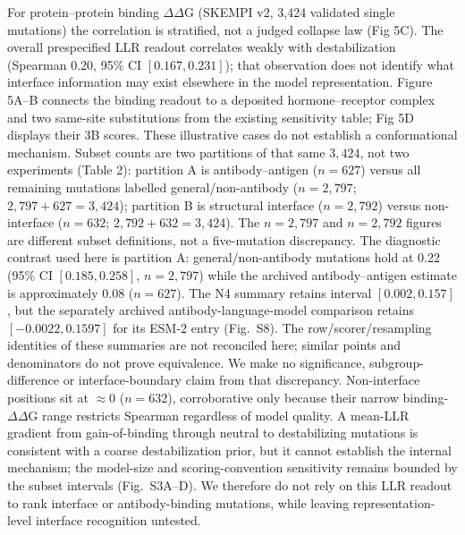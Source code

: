 \documentclass[12pt]{article}
\begin{document}
For protein--protein binding $\Delta$$\Delta$G (SKEMPI v2, 3,424 validated single mutations) the correlation is stratified, not a judged collapse law (Fig 5C). The overall prespecified LLR readout correlates weakly with destabilization (Spearman 0.20, 95\% CI $[0.167, 0.231]$); that observation does not identify what interface information may exist elsewhere in the model representation. Figure 5A--B connects the binding readout to a deposited hormone--receptor complex and two same-site substitutions from the existing sensitivity table; Fig 5D displays their 3B scores. These illustrative cases do not establish a conformational mechanism. Subset counts are two partitions of that same $3{,}424$, not two experiments (Table 2): partition A is antibody--antigen ($n=627$) versus all remaining mutations labelled general/non-antibody ($n=2{,}797$; $2{,}797+627=3{,}424$); partition B is structural interface ($n=2{,}792$) versus non-interface ($n=632$; $2{,}792+632=3{,}424$). The $n=2{,}797$ and $n=2{,}792$ figures are different subset definitions, not a five-mutation discrepancy. The diagnostic contrast used here is partition A: general/non-antibody mutations hold at 0.22 (95\% CI $[0.185, 0.258]$, $n=2{,}797$) while the archived antibody--antigen estimate is approximately 0.08 ($n=627$). The N4 summary retains interval $[0.002,0.157]$, but the separately archived antibody-language-model comparison retains $[-0.0022,0.1597]$ for its ESM-2 entry (Fig.~S8). The row/scorer/resampling identities of these summaries are not reconciled here; similar points and denominators do not prove equivalence. We make no significance, subgroup-difference or interface-boundary claim from that discrepancy. Non-interface positions sit at $\approx$0 ($n=632$), corroborative only because their narrow binding-$\Delta$$\Delta$G range restricts Spearman regardless of model quality. A mean-LLR gradient from gain-of-binding through neutral to destabilizing mutations is consistent with a coarse destabilization prior, but it cannot establish the internal mechanism; the model-size and scoring-convention sensitivity remains bounded by the subset intervals (Fig.~S3A--D). We therefore do not rely on this LLR readout to rank interface or antibody-binding mutations, while leaving representation-level interface recognition untested.
\end{document}
